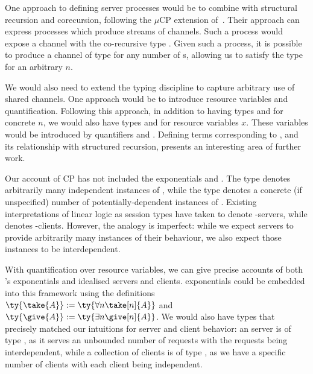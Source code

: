 \documentclass[UKenglish]{llncs}
\begin{document}
One approach to defining server processes would be to combine \nodcap with
structural recursion and corecursion, following the $\mu\text{CP}$ extension
of~\textcite{lindley2016}.  Their approach can express processes which produce
streams of  channels. Such a process would expose a channel with the
co-recursive type .  Given such a process, it is
possible to produce a channel of type  for
any number of s, allowing us to satisfy the type  for an
arbitrary $n$.

We would also need to extend the typing discipline to capture arbitrary use of
shared channels.  One approach would be to introduce resource variables and
quantification.  Following this approach, in addition to having types
 and  for concrete $n$, we would also have types
 and  for resource variables $x$.  These variables
would be introduced by quantifiers  and .
Defining terms corresponding to , and its relationship with
structured recursion, presents an interesting area of further work.

Our account of CP has not included the exponentials  and . The type  denotes arbitrarily many independent instances of
, while the type  denotes a concrete (if unspecified) number
of potentially-dependent instances of .  Existing interpretations of
linear logic as session types have taken  to denote -servers,
while  denotes -clients.  However, the analogy is imperfect:
while we expect servers to provide arbitrarily many instances of their
behaviour, we also expect those instances to be interdependent.

With quantification over resource variables, we can give precise accounts of
both \cp's exponentials and idealised servers and clients. \cp exponentials
could be embedded into this framework using the definitions $\ty{\take{A}} :=
\ty{\forall{n}\take[n]{A}}$ and $\ty{\give{A}} := \ty{\exists{n}{\give[n]{A}}}$.
We would also have types that precisely matched our intuitions for server and
client behavior:
an  server is of type , as it serves an
unbounded number of requests with the requests being interdependent, while a
collection of  clients is of type , as we have
a specific number of clients with each client being independent.
\end{document}
